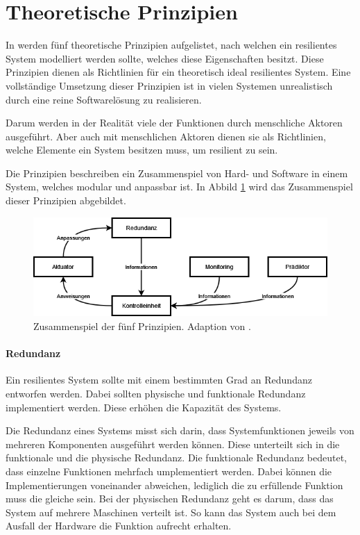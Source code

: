 \documentclass[]{lni}
\begin{document}
\section*{Theoretische Prinzipien} \label{design-prinicpals}

In \cite[104]{Zhang.2010} werden fünf theoretische Prinzipien aufgelistet, nach welchen ein resilientes System modelliert werden sollte, welches diese Eigenschaften besitzt.
Diese Prinzipien dienen als Richtlinien für ein theoretisch ideal resilientes System.
Eine vollständige Umsetzung dieser Prinzipien ist in vielen Systemen unrealistisch durch eine reine Softwarelösung zu realisieren.

Darum werden in der Realität viele der Funktionen durch menschliche Aktoren ausgeführt.
Aber auch mit menschlichen Aktoren dienen sie als Richtlinien, welche Elemente ein System besitzen muss, um resilient zu sein.

Die Prinzipien beschreiben ein Zusammenspiel von Hard- und Software in einem System, welches modular und anpassbar ist.
In Abbild \ref{fig:ResilienzPrinzipien} wird das Zusammenspiel dieser Prinzipien abgebildet.

\begin{figure}
    \centering
    \includegraphics[width=.9\textwidth]{images/Resilienz Prinzipien.drawio.png}
    \caption{Zusammenspiel der fünf Prinzipien. Adaption von \cite[Figure 5, S. 109]{Zhang.2010}.}
    \label{fig:ResilienzPrinzipien}
\end{figure}

\paragraph{Redundanz}
Ein resilientes System sollte mit einem bestimmten Grad an Redundanz entworfen werden.
Dabei sollten physische und funktionale Redundanz implementiert werden.
Diese erhöhen die Kapazität des Systems.

Die Redundanz eines Systems misst sich darin, dass Systemfunktionen jeweils von mehreren Komponenten ausgeführt werden können.
Diese unterteilt sich in die funktionale und die physische Redundanz.
Die funktionale Redundanz bedeutet, dass einzelne Funktionen mehrfach umplementiert werden.
Dabei können die Implementierungen voneinander abweichen, lediglich die zu erfüllende Funktion muss die gleiche sein.
Bei der physischen Redundanz geht es darum, dass das System auf mehrere Maschinen verteilt ist.
So kann das System auch bei dem Ausfall der Hardware die Funktion aufrecht erhalten.
\end{document}
